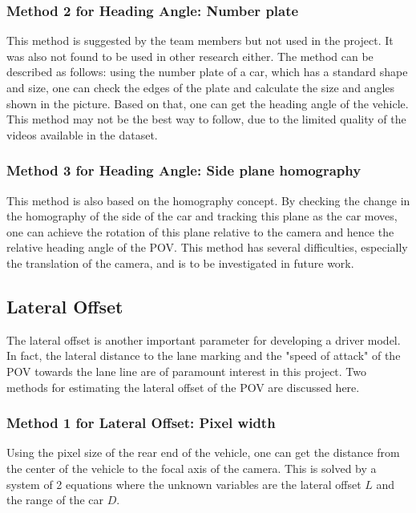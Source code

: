 \subsubsection{Method 2 for Heading Angle: Number plate}
This method is suggested by the team members but not used in the project. It was also not found to be used in other research either. The method can be described as follows: using the number plate of a car, which has a standard shape and size, one can check the edges of the plate and calculate the size and angles shown in the picture. Based on that, one can get the heading angle of the vehicle. This method may not be the best way to follow, due to the limited quality of the videos available in the dataset.

\subsubsection{Method 3 for Heading Angle: Side plane homography}
This method is also based on the homography concept. By checking the change in the homography of the side of the car and tracking this plane as the car moves, one can achieve the rotation of this plane relative to the camera and hence the relative heading angle of the POV. This method has several difficulties, especially the translation of the camera, and is to be investigated in future work.

\subsection{Lateral Offset}
The lateral offset is another important parameter for developing a driver model. In fact, the lateral distance to the lane marking and the "speed of attack" of the POV towards the lane line are of paramount interest in this project. Two methods for estimating the lateral offset of the POV are discussed here.

\subsubsection{Method 1 for Lateral Offset: Pixel width}
Using the pixel size of the rear end of the vehicle, one can get the distance from the center of the vehicle to the focal axis of the camera. This is solved by a system of 2 equations where the unknown variables are the lateral offset $L$ and the range of the car $D$.

